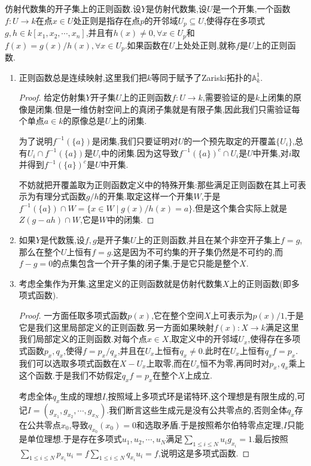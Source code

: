 仿射代数集的开子集上的正则函数.设$Y$是仿射代数集,设$U$是一个开集,一个函数$f:U\to k$在点$x\in U$处正则是指存在点$p$的开邻域$U_p\subseteq U$,使得存在多项式$g,h\in k[x_1,x_2,\cdots,x_n]$,并且有$h(x)\not=0,\forall x\in U_p$和$f(x)=g(x)/h(x),\forall x\in U_p$.如果函数在$U$上处处正则,就称$f$是$U$上的正则函数.
\begin{enumerate}
	\item 正则函数总是连续映射,这里我们把$k$等同于赋予了Zariski拓扑的$\mathbb{A}_k^1$.
	\begin{proof}
		
		给定仿射集$Y$开子集$U$上的正则函数$f:U\to k$,需要验证的是$k$上闭集的原像是闭集.但是一维仿射空间上的真闭子集就是有限子集,因此我们只需验证每个单点$a\in k$的原像总是$U$上的闭集.
		
		为了说明$f^{-1}(\{a\})$是闭集,我们只要证明对$U$的一个预先取定的开覆盖$\{U_i\}$,总有$U_i\cap f^{-1}(\{a\})$是$U_i$中的闭集.因为这导致$f^{-1}(\{a\})^c\cap U_i$是$U$中开集,对$i$取并得到$f^{-1}(\{a\})^c$是$U$中开集.
		
		不妨就把开覆盖取为正则函数定义中的特殊开集:那些满足正则函数在其上可表示为有理分式函数$g/h$的开集.取定这样一个开集$W$,于是$f^{-1}(\{a\})\cap W=\{x\in W\mid g(x)/h(x)=a\}$.但是这个集合实际上就是$Z(g-ah)\cap W$,它是$W$中的闭集.
	\end{proof}
	\item 如果$Y$是代数簇,设$f,g$是开子集$U$上的正则函数,并且在某个非空开子集上$f=g$,那么在整个$U$上恒有$f=g$.这是因为不可约集的开子集仍然是不可约的,而$f-g=0$的点集包含一个开子集的闭子集,于是它只能是整个$X$.
	\item 考虑全集作为开集,这里定义的正则函数就是仿射代数集$X$上的正则函数(即多项式函数).
	\begin{proof}
		
		一方面任取多项式函数$p(x)$,它在整个空间$X$上可表示为$p(x)/1$,于是它是我们这里局部定义的正则函数.另一方面如果映射$f(x):X\to k$满足这里我们局部定义的正则函数.对每个点$x\in X$,取定义中的开邻域$U_x$,使得存在多项式函数$p_x,q_x$,使得$f=p_x/q_x$,并且在$U_x$上恒有$q_x\not=0$.此时在$U_x$上恒有$q_xf=p_x$.我们可以选取多项式函数在$X-U_x$上取零,而在$U_x$恒不为零,再同时对$p_x,q_x$乘上这个函数.于是我们不妨假定$q_xf=p_x$在整个$X$上成立.
		
		考虑全体$q_x$生成的理想$I$,按照域上多项式环是诺特环,这个理想是有限生成的,可记$I=(g_{x_1},g_{x_2},\cdots,g_{x_N})$.我们断言这些生成元是没有公共零点的,否则全体$q_x$存在公共零点$x_0$,导致$q_{x_0}(x_0)=0$和选取矛盾.于是按照希尔伯特零点定理,$I$只能是单位理想.于是存在多项式$u_1,u_2,\cdots,u_N$满足$\sum_{1\le i\le N}u_ig_{x_i}=1$.最后按照$\sum_{1\le i\le N}p_{x_i}u_i=f\sum_{1\le i\le N}q_{x_i}u_i=f$,说明这是多项式函数.
	\end{proof}
\end{enumerate}

